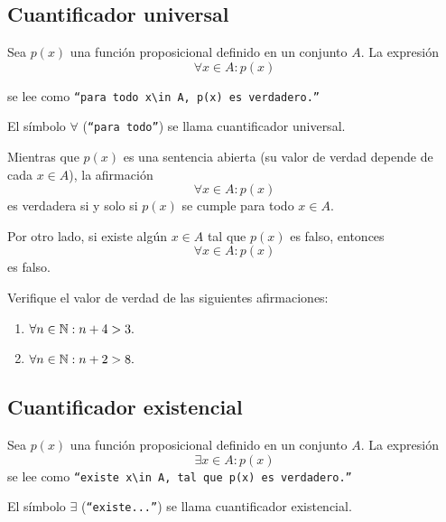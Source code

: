 \subsection{Cuantificador universal}


 Sea $p(x)$ una función proposicional definido en un conjunto $A.$ La expresión
 \begin{equation}
 \label{lip:4.1}
   \forall x \in A: p(x)
 \end{equation}

 
 se lee como  \texttt{``para todo $x\in A,$ $p(x)$ es verdadero.''}  
 
 El símbolo $\forall$ (\texttt{``para todo''}) se llama cuantificador universal.




 Mientras que $p(x)$ es una sentencia abierta (su valor de verdad depende de cada $x\in A$), la afirmación 
 $$\forall x\in A: p(x)$$ es verdadera si y solo si $p(x)$ se cumple para todo $x\in A.$  



 Por otro lado, si existe algún $x\in A$ tal que $p(x)$ es falso, entonces $$\forall x\in A: p(x)$$ es falso.



 \begin{problema}
  \label{lip:exmp:4.8}
  Verifique el valor de verdad de las siguientes afirmaciones:
  \begin{enumerate}
   \item $\forall n \in \mathbb{N}: n+4>3.$ 
   \item $\forall n \in \mathbb{N}: n+2>8.$
  \end{enumerate}

 \end{problema}



\subsection{Cuantificador existencial}


 Sea $p(x)$ una función proposicional definido en un conjunto $A.$ La expresión
 \begin{equation}
 \label{lip:4.3}
   \exists x \in A: p(x)
 \end{equation} 
 se lee como  \texttt{``existe $x\in A,$ tal que $p(x)$ es verdadero.''}  
 
 El símbolo $\exists$ (\texttt{``existe...''}) se llama cuantificador existencial.





